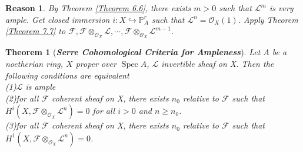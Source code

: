\documentclass{ctexart}
\newtheorem{theorem}{Theorem}[section]
\newtheorem{reason}{Reason}[section]
\newcommand{\spec}{\operatorname{Spec}}
\begin{document}
\begin{reason}
    By Theorem \ref{Theorem 6.6}, there exists $m > 0$ such that $\mathcal{L}^{m}$ is very ample.
    Get closed immersion $i: X \hookrightarrow \mathbb{P}_{A}^{r}$ such that $\mathcal{L}^{n} = \mathcal{O}_{X}(1)$.
    Apply Theorem \ref{Theorem 7.7} to $\mathcal{F}, \mathcal{F} \otimes_{\mathcal{O}_{X}} \mathcal{L}, \cdots, \mathcal{F} \otimes_{\mathcal{O}_{X}} \mathcal{L}^{m - 1}$.
\end{reason}
\begin{theorem}[\textbf{\emph{Serre Cohomological Criteria for Ampleness}}]
    Let $A$ be a noetherian ring, $X$ proper over $\spec A$, $\mathcal{L}$ invertible sheaf on X.
    Then the following conditions are equivalent \\
    (1)$\mathcal{L}$ is ample \\
    (2)for all $\mathcal{F}$ coherent sheaf on X, 
    there exists $n_{0}$ relative to $\mathcal{F}$ such that $H^{i}(X, \mathcal{F} \otimes_{\mathcal{O}_{X}} \mathcal{L}^{n}) = 0$ for all $i > 0$ and $n \ge n_{0}$. \\
    (3)for all $\mathcal{F}$ coherent sheaf on X, 
    there exists $n_{0}$ relative to $\mathcal{F}$ such that $H^{1}(X, \mathcal{F} \otimes_{\mathcal{O}_{X}} \mathcal{L}^{n}) = 0$.
    \label{Theorem 7.8}
\end{theorem}
\end{document}
